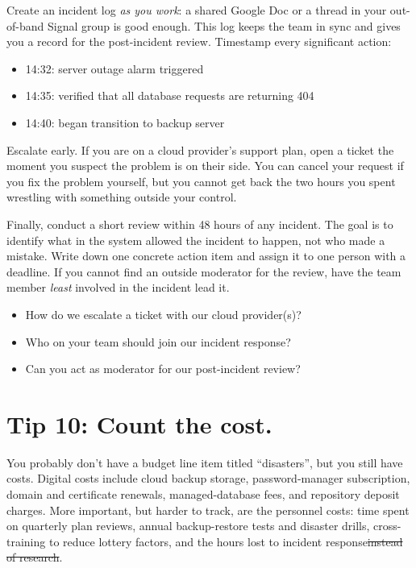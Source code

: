 \documentclass[10pt,letterpaper]{article}
\providecommand{\DIFdel}[1]{{\protect\color{red}\sout{#1}}} %
\providecommand{\DIFdelbegin}{} %
\providecommand{\DIFdelend}{} %
\begin{document}
Create an incident log \emph{as you work}: a shared Google Doc or a thread in
your out-of-band Signal group is good enough.  This log keeps the team in sync
and gives you a record for the post-incident review.  Timestamp every
significant action:

\begin{itemize}
\item 14:32: server outage alarm triggered
\item 14:35: verified that all database requests are returning 404
\item 14:40: began transition to backup server
\end{itemize}

Escalate early. If you are on a cloud provider's support plan, open a ticket the
moment you suspect the problem is on their side. You can cancel your request if
you fix the problem yourself, but you cannot get back the two hours you spent
wrestling with something outside your control.

Finally, conduct a short review within 48 hours of any incident. The goal is to
identify what in the system allowed the incident to happen, not who made a
mistake. Write down one concrete action item and assign it to one person with a
deadline. If you cannot find an outside moderator for the review, have the team
member \emph{least} involved in the incident lead it.

\begin{notebox}
  \begin{itemize}
  \item How do we escalate a ticket with our cloud provider(s)?
  \item Who on your team should join our incident response?
  \item Can you act as moderator for our post-incident review?
  \end{itemize}
\end{notebox}

\section*{Tip 10: Count the cost.}

You probably don't have a budget line item titled ``disasters'', but you still
have costs.  Digital costs include cloud backup storage, password-manager
subscription, domain and certificate renewals, managed-database fees, and
repository deposit charges.  More important, but harder to track, are the
personnel costs: time spent on quarterly plan reviews, annual backup-restore
tests and disaster drills, cross-training to reduce lottery factors, and the
hours lost to incident response\DIFdelbegin \DIFdel{instead of research}\DIFdelend .
\end{document}
